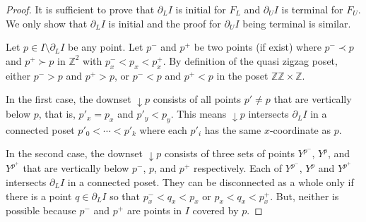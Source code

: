 \documentclass[10pt,a4paper]{amsart}
\newcommand{\z}{\mathbb{Z}}
\newcommand{\zz}{\mathbb{ZZ}}
\begin{document}
\begin{proof}
    It is sufficient to prove that $\partial_L I$ is initial for $F_L$ and $\partial_U I$ is terminal for $F_U$. We only show that $\partial_L I$ is initial and the proof
    for $\partial_U I$ being terminal is similar.

    Let $p\in I\setminus \partial_L I$ be any point. Let $p^-$ and $p^+$ be two points (if exist) where $p^-\prec p$ and $p^+ \succ p$ in $\z^2$ with $p^-_x < p_x < p^+_x$. By definition of the quasi zigzag poset, either $p^- > p$ and $p^+ > p$, or $p^- < p$ and
    $p^+ < p$ in the poset $\zz\times \z$.
    
    
    In the first
    case, the downset $\downarrow p$ consists of all points $p'\neq p$ that are vertically below $p$, that is, 
    $p'_x=p_x$ and $p'_y< p_y$. This means $\downarrow p$ intersects $\partial_L I$
    in a connected poset $p'_0 <\cdots < p'_k$ where each $p'_i$ has the same $x$-coordinate as $p$.

    In the second case, the downset $\downarrow p$ consists of three sets of points $Y^{p^-}$, $Y^p$, and $Y^{p^+}$  
    that are vertically below $p^-$, $p$, and $p^+$ respectively. Each of $Y^{p^-}$,
    $Y^p$ and $Y^{p^+}$ intersects $\partial_L I$ in a connected poset. They can be
    disconnected as a whole only if there is a point $q\in \partial_L I$ 
    so that
    $p^-_x < q_x < p_x$ or $p_x < q_x < p^+_x$. But, neither is possible because
    $p^-$ and $p^+$ are points in $I$ covered by $p$.    
\end{proof}
\end{document}
